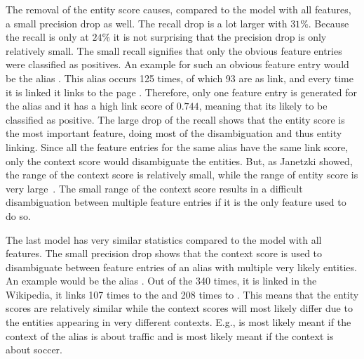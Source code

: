 The removal of the entity score causes, compared to the model with all features, a small precision drop as well. The recall drop is a lot larger with $31\%$. Because the recall is only at $24\%$ it is not surprising that the precision drop is only relatively small. The small recall signifies that only the obvious feature entries were classified as positives. An example for such an obvious feature entry would be the alias . This alias occurs 125 times, of which 93 are as link, and every time it is linked it links to the page . Therefore, only one feature entry is generated for the alias and it has a high link score of $0.744$, meaning that its likely to be classified as positive. The large drop of the recall shows that the entity score is the most important feature, doing most of the disambiguation and thus entity linking. Since all the feature entries for the same alias have the same link score, only the context score would disambiguate the entities. But, as Janetzki showed, the range of the context score is relatively small, while the range of entity score is very large\ \cite{janetzki}. The small range of the context score results in a difficult disambiguation between multiple feature entries if it is the only feature used to do so.\par
The last model has very similar statistics compared to the model with all features. The small precision drop shows that the context score is used to disambiguate between feature entries of an alias with multiple very likely entities. An example would be the alias . Out of the 340 times, it is linked in the Wikipedia, it links 107 times to the  and 208 times to . This means that the entity scores are relatively similar while the context scores will most likely differ due to the entities appearing in very different contexts. E.g.,  is most likely meant if the context of the alias is about traffic and  is most likely meant if the context is about soccer.\par

